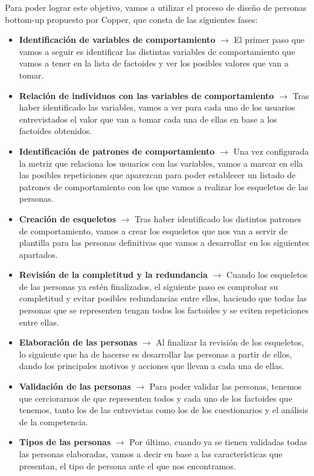 Para poder lograr este objetivo, vamos a utilizar el proceso de diseño de personas bottom-up propuesto por Copper, que consta de las siguientes fases:
\begin{itemize}
    \item \textbf{Identificación de variables de comportamiento} $\rightarrow$ El primer paso que vamos a seguir es identificar las distintas variables de comportamiento que vamos a tener en la lista de factoides y ver los posibles valores que van a tomar.
    \item \textbf{Relación de individuos con las variables de comportamiento} $\rightarrow$ Tras haber identificado las variables, vamos a ver para cada uno de los usuarios entrevistados el valor que van a tomar cada una de ellas en base a los factoides obtenidos.
    \item \textbf{Identificación de patrones de comportamiento} $\rightarrow$ Una vez configurada la metriz que relaciona los usuarios con las variables, vamos a marcar en ella las posibles repeticiones que aparezcan para poder establecer un listado de patrones de comportamiento con los que vamos a realizar los esqueletos de las personas.
    \item \textbf{Creación de esqueletos} $\rightarrow$ Tras haber identificado los distintos patrones de comportamiento, vamos a crear los esqueletos que nos van a servir de plantilla para las personas definitivas que vamos a desarrollar en los siguientes apartados.
    \item \textbf{Revisión de la completitud y la redundancia} $\rightarrow$ Cuando los esqueletos de las personas ya estén finalizados, el siguiente paso es comprobar su completitud y evitar posibles redundancias entre ellos, haciendo que todas las personas que se representen tengan todos los factoides y se eviten repeticiones entre ellas.
    \item \textbf{Elaboración de las personas} $\rightarrow$ Al finalizar la revisión de los esqueletos, lo siguiente que ha de hacerse es desarrollar las personas a partir de ellos, dando los principales motivos y acciones que llevan a cada una de ellas.
    \item \textbf{Validación de las personas} $\rightarrow$ Para poder validar las personas, tenemos que cerciorarnos de que representen todos y cada uno de los factoides que tenemos, tanto los de las entrevistas como los de los cuestionarios y el análisis de la competencia.
    \item \textbf{Tipos de las personas} $\rightarrow$ Por último, cuando ya se tienen validadas todas las personas elaboradas, vamos a decir en base a las características que presentan, el tipo de persona ante el que nos encontramos.
\end{itemize}

